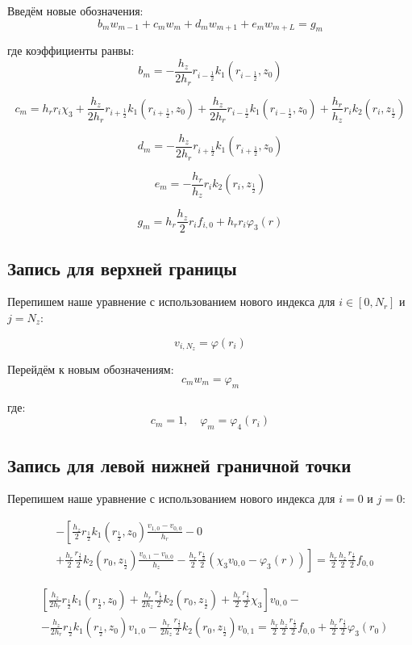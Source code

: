 Введём новые обозначения:
\[
  b_m w_{m - 1} + c_m w_m + d_m w_{m + 1} + e_m w_{m + L} = g_m
\]

где коэффициенты ранвы:
\[
  b_m = - \frac{h_z}{2 h_r} r_{i - \frac{1}{2}} k_1(r_{i - \frac{1}{2}}, z_0)
\]

\[
  c_m = h_r r_i \chi_3 +\frac{h_z}{2 h_r} r_{i + \frac{1}{2}} k_1(r_{i + \frac{1}{2}}, z_0) + \frac{h_z}{2 h_r} r_{i - \frac{1}{2}} k_1(r_{i - \frac{1}{2}}, z_0)
  + \frac{h_r}{h_z} r_i k_2(r_i, z_{\frac{1}{2}}) 
\]

\[
  d_m = - \frac{h_z}{2 h_r} r_{i + \frac{1}{2}} k_1(r_{i + \frac{1}{2}}, z_0)
\]

\[
  e_m = - \frac{h_r}{h_z} r_i k_2 (r_i, z_{\frac{1}{2}})
\]

\[
  g_m = h_r \frac{h_z}{2} r_i f_{i, 0} + h_r r_i \varphi_3(r)
\]

\subsection{Запись для верхней границы}
Перепишем наше уравнение с использованием нового индекса для $i \in [0, N_r] $ и $ j = N_z $:

\[
  v_{i, N_z} = \varphi(r_i)
\]

Перейдём к новым обозначениям:
\[
  c_m w_m = \varphi_m
\]

где:
\[
  c_m = 1, \quad \varphi_m = \varphi_4(r_i)
\]


\subsection{Запись для левой нижней граничной точки}

Перепишем наше уравнение с использованием нового индекса для $i = 0 $ и $ j = 0 $:

\begin{align*}
  &- \left [ 
  \frac{h_z}{2} r_{\frac{1}{2}} k_1(r_{\frac{1}{2}}, z_0) \frac{v_{1, 0} - v_{0, 0}}{h_{r}}
  - 0
  \right . \\
  &\left .
  + \frac{h_r}{2} \frac{r_{\frac{1}{2}}}{2} k_2(r_0, z_{\frac{1}{2}}) \frac{v_{0, 1} - v_{0, 0}}{h_{z}}
  - \frac{h_r}{2} \frac{r_{\frac{1}{2}}}{2} (\chi_3 v_{0, 0} - \varphi_3(r))
  \right ]  = \frac{h_r}{2} \frac{h_z}{2} \frac{r_{\frac{1}{2}}}{2} f_{0, 0}
\end{align*}

\begin{align*}
  &\left[
    \frac{h_z}{2 h_r} r_{\frac{1}{2}} k_1(r_{\frac{1}{2}}, z_0) + \frac{h_r}{2 h_z} \frac{r_{\frac{1}{2}}}{2} k_2(r_0, z_{\frac{1}{2}}) + \frac{h_r}{2} \frac{r_\frac{1}{2}}{2} \chi_3
  \right] v_{0, 0} - \\
  & - \frac{h_z}{2 h_r} r_\frac{1}{2} k_1(r_\frac{1}{2}, z_0) v_{1,0} 
  - \frac{h_r}{2 h_z} \frac{r_{\frac{1}{2}}}{2} k_2(r_0, z_{\frac{1}{2}}) v_{0, 1}
  = \frac{h_r}{2} \frac{h_z}{2} \frac{r_{\frac{1}{2}}}{2} f_{0, 0} + \frac{h_r}{2} \frac{r_{\frac{1}{2}}}{2} \varphi_3(r_0)
\end{align*}

